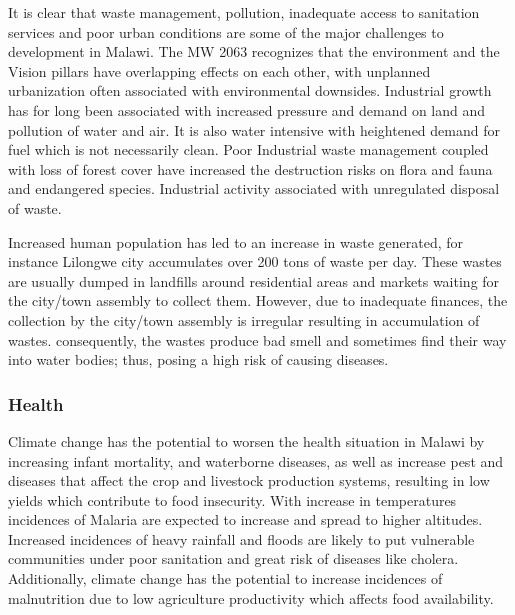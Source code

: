 \documentclass[
]{book}
\begin{document}
It is clear that waste management, pollution, inadequate access to sanitation services and poor urban conditions are some of the major challenges to development
in Malawi. The MW 2063 recognizes that the environment and the Vision pillars have overlapping effects on each other, with unplanned urbanization often
associated with environmental downsides. Industrial growth has for long been associated with increased pressure and demand on land and pollution of water and
air. It is also water intensive with heightened demand for fuel which is not necessarily clean. Poor Industrial waste management coupled with loss of forest
cover have increased the destruction risks on flora and fauna and endangered species. Industrial activity associated with unregulated disposal of waste.

Increased human population has led to an increase in waste generated, for instance Lilongwe city accumulates over 200 tons of waste per day. These wastes are
usually dumped in landfills around residential areas and markets waiting for the city/town assembly to collect them. However, due to inadequate finances, the
collection by the city/town assembly is irregular resulting in accumulation of wastes. consequently, the wastes produce bad smell and sometimes find their way
into water bodies; thus, posing a high risk of causing diseases.

\hypertarget{health}{%
\subsubsection{Health}\label{health}}

Climate change has the potential to worsen the health situation in Malawi by increasing infant mortality, and waterborne diseases, as well as increase pest and
diseases that affect the crop and livestock production systems, resulting in low yields which contribute to food insecurity. With increase in temperatures
incidences of Malaria are expected to increase and spread to higher altitudes. Increased incidences of heavy rainfall and floods are likely to put vulnerable
communities under poor sanitation and great risk of diseases like cholera. Additionally, climate change has the potential to increase incidences of malnutrition
due to low agriculture productivity which affects food availability.
\end{document}
